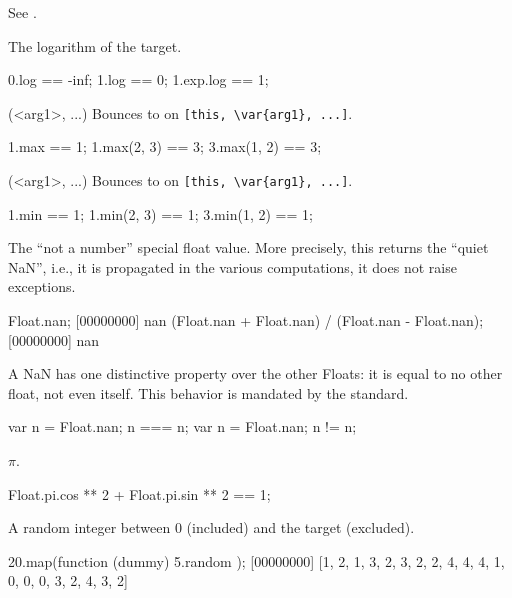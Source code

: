 \begin{urbiscriptapi}
\item[limits]
  See .

\item[log]
  The logarithm of the target.
\begin{urbiassert}
0.log == -inf;
1.log == 0;
1.exp.log == 1;
\end{urbiassert}

\item[max](<arg1>, ...)%
  Bounces to  on \lstinline|[this, \var{arg1}, ...]|.
\begin{urbiassert}
1.max == 1;
1.max(2, 3) == 3;
3.max(1, 2) == 3;
\end{urbiassert}

\item[min](<arg1>, ...)%
  Bounces to  on \lstinline|[this, \var{arg1}, ...]|.
\begin{urbiassert}
1.min == 1;
1.min(2, 3) == 1;
3.min(1, 2) == 1;
\end{urbiassert}

\item[nan]
  The ``not a number'' special float value.  More precisely, this
  returns the ``quiet NaN'', i.e., it is propagated in the various
  computations, it does not raise exceptions.
\begin{urbiscript}
Float.nan;
[00000000] nan
(Float.nan + Float.nan) / (Float.nan - Float.nan);
[00000000] nan
\end{urbiscript}

A {NaN} has one distinctive property over the other Floats: it is
equal to no other float, not even itself.  This behavior is mandated
by the  standard.
\begin{urbiassert}
{ var n = Float.nan; n === n};
{ var n = Float.nan; n  != n};
\end{urbiassert}

\item[pi]
  $\pi$.
\begin{urbiassert}
Float.pi.cos ** 2 + Float.pi.sin ** 2 == 1;
\end{urbiassert}

\item[random]
  A random integer between 0 (included) and the target (excluded).
\begin{urbiscript}
20.map(function (dummy) { 5.random });
[00000000] [1, 2, 1, 3, 2, 3, 2, 2, 4, 4, 4, 1, 0, 0, 0, 3, 2, 4, 3, 2]
\end{urbiscript}


\end{urbiscriptapi}
